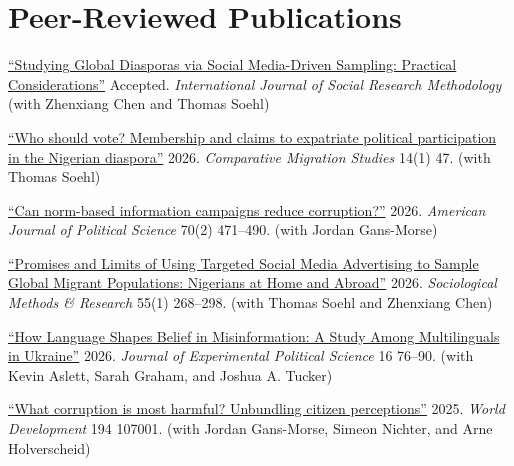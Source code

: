 %

\section{\sc Peer-Reviewed Publications}

\renewcommand{\labelenumi}{\theenumi.}
\begin{etaremune}

  \item \href{https://doi.org/10.1080/13645579.2026.2693111}{``Studying Global Diasporas via Social Media-Driven Sampling: Practical Considerations''} Accepted. \textit{International Journal of Social Research Methodology} (with Zhenxiang Chen and Thomas Soehl)

  \item \href{https://doi.org/10.1186/s40878-026-00546-3}{``Who should vote? Membership and claims to expatriate political participation in the Nigerian diaspora''} 2026. \textit{Comparative Migration Studies} 14(1) 47. (with Thomas Soehl)

  \item \href{https://doi.org/10.1111/ajps.12940}{``Can norm-based information campaigns reduce corruption?''} 2026. \textit{American Journal of Political Science} 70(2) 471–490. (with Jordan Gans-Morse)

  \item \href{https://doi.org/10.1177/00491241241266634}{``Promises and Limits of Using Targeted Social Media Advertising to Sample Global Migrant Populations: Nigerians at Home and Abroad''} 2026. \textit{Sociological Methods \& Research} 55(1) 268–298. (with Thomas Soehl and Zhenxiang Chen)

  \item \href{https://doi.org/10.1017/xps.2025.10011}{``How Language Shapes Belief in Misinformation: A Study Among Multilinguals in Ukraine''} 2026. \textit{Journal of Experimental Political Science} 16 76–90. (with Kevin Aslett, Sarah Graham, and Joshua A. Tucker)

  \item \href{https://www.sciencedirect.com/science/article/pii/S0305750X25000865}{``What corruption is most harmful? Unbundling citizen perceptions''} 2025. \textit{World Development} 194 107001. (with Jordan Gans-Morse, Simeon Nichter, and Arne Holverscheid)


\end{etaremune}
